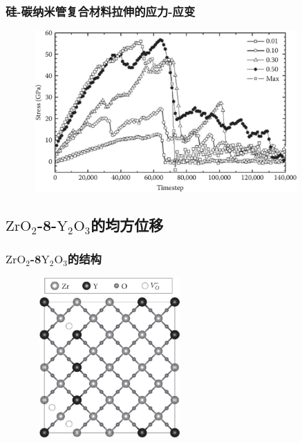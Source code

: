 \frame
{
	\frametitle{硅-碳纳米管复合材料拉伸的应力-应变}
\begin{figure}[h!]
\centering
\vskip -5pt
\includegraphics[height=2.42in,width=4.0in, viewport=0 0 1200 730,clip]{Figures/Lammps_tutorial-15-Stress_strain-curves-of-the-Si-CNT.png}
\caption{\fontsize{6.2pt}{5.2pt}}%
\label{LAMMPS_Stress-train-curve}
\end{figure}
}

\subsection{$\mathrm{ZrO}_2$-\rm{8}-$\mathrm{Y}_2\mathrm{O}_3$的均方位移}

\frame
{
	\frametitle{$\mathrm{ZrO}_2$-\textrm{8}$\mathrm{Y}_2\mathrm{O}_3$的结构}
\begin{figure}[h!]
\centering
\vskip -5pt
\includegraphics[height=2.40in,width=2.3in, viewport=0 0 640 680,clip]{Figures/Lammps_tutorial-16-sliced-structure-of-ZrO2-8Y2O3-system.png}
\caption{\fontsize{6.2pt}{5.2pt}}%
\label{LAMMPS_slice-structure-of-ZrO2-8Y2O3}
\end{figure}
}

